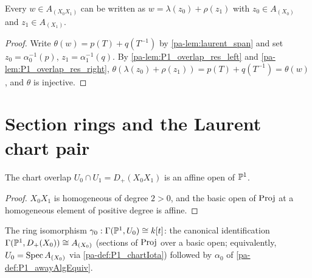 \begin{lemma}
  \label{pa-lem:P1_overlap_span}
  \leanok

  Every \(w \in A_{(X_0 X_1)}\) can be written as \(w = \lambda(z_0) + \rho(z_1)\) with
  \(z_0 \in A_{(X_0)}\) and \(z_1 \in A_{(X_1)}\).
\end{lemma}
\begin{proof}
  \leanok
  Write \(\theta(w) = p(T) + q(T^{-1})\) by \ref{pa-lem:laurent_span} and set
  \(z_0 = \alpha_0^{-1}(p)\), \(z_1 = \alpha_1^{-1}(q)\). By
  \ref{pa-lem:P1_overlap_res_left} and \ref{pa-lem:P1_overlap_res_right},
  \(\theta(\lambda(z_0) + \rho(z_1)) = p(T) + q(T^{-1}) = \theta(w)\), and \(\theta\) is
  injective.
\end{proof}

\section{Section rings and the Laurent chart pair}

\begin{lemma}
  \label{pa-lem:P1_overlap_affine}
  \leanok

  The chart overlap \(U_0 \cap U_1 = D_+(X_0 X_1)\) is an affine open of \(\mathbb{P}^1\).
\end{lemma}
\begin{proof}
  \leanok
  \(X_0 X_1\) is homogeneous of degree \(2 > 0\), and the basic open of \(\operatorname{Proj}\) at a
  homogeneous element of positive degree is affine.
\end{proof}

\begin{definition}
  \label{pa-def:P1_chartSectionsEquiv0}
  \leanok

  The ring isomorphism \(\gamma_0 : \Gamma(\mathbb{P}^1, U_0) \cong k[t]\): the canonical
  identification \(\Gamma(\mathbb{P}^1, D_+(X_0)) \cong A_{(X_0)}\) (sections of \(\operatorname{Proj}\) over a
  basic open; equivalently, \(U_0 = \operatorname{Spec} A_{(X_0)}\) via \ref{pa-def:P1_chartIota}) followed by
  \(\alpha_0\) of \ref{pa-def:P1_awayAlgEquiv}.
\end{definition}

